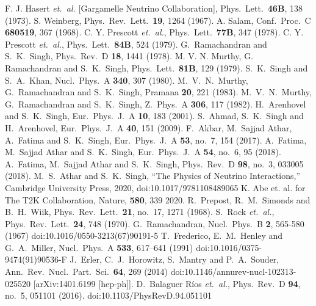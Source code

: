\begin{thebibliography}{99}
 F. J. Hasert {\it et.\ al.} [Gargamelle Neutrino Collaboration], Phys.\ Lett.\  {\bf 46B}, 138 (1973).  
 S. Weinberg, Phys.\ Rev.\ Lett.\  {\bf 19}, 1264 (1967).
 A. Salam,  Conf.\ Proc.\ C {\bf 680519}, 367 (1968).
 C. Y. Prescott {\it et.\ al.}, Phys.\ Lett.\  {\bf 77B}, 347 (1978).
 C. Y. Prescott {\it et.\ al.}, Phys.\ Lett.\  {\bf 84B}, 524 (1979).
 G.~Ramachandran and S.~K.~Singh, Phys.\ Rev.\ D {\bf 18}, 1441 (1978).
 M. V. N. Murthy, G. Ramachandran and S.~K.~Singh, Phys.\ Lett.\  {\bf 81B}, 129 (1979).
 S.~K.~Singh and S.~A.~Khan, Nucl.\ Phys.\ A {\bf 340}, 307 (1980).
 M.~V.~N.~Murthy, G.~Ramachandran and S.~K.~Singh, Pramana {\bf 20}, 221 (1983).
 M.~V.~N.~Murthy, G.~Ramachandran and S.~K.~Singh, Z.\ Phys.\ A {\bf 306}, 117 (1982).
 H.~Arenhovel and S.~K.~Singh, Eur.\ Phys.\ J.\ A {\bf 10}, 183 (2001).
 S.~Ahmad, S.~K.~Singh and H.~Arenhovel, Eur.\ Phys.\ J.\ A {\bf 40}, 151 (2009).
 F.~Akbar, M.~Sajjad Athar, A.~Fatima and S.~K.~Singh, Eur.\ Phys.\ J.\ A {\bf 53}, no.\ 7, 154 (2017).
 A.~Fatima, M.~Sajjad Athar and S.~K.~Singh, Eur.\ Phys.\ J.\ A {\bf 54}, no.\ 6, 95 (2018).
 A.~Fatima, M.~Sajjad Athar and S.~K.~Singh, Phys.\ Rev.\ D {\bf 98}, no.\ 3, 033005 (2018).
 M.~S.~Athar and S.~K.~Singh, ``The Physics of Neutrino Interactions,'' Cambridge University Press, 2020,  doi:10.1017/9781108489065
 K. Abe et. al. for The T2K Collaboration, Nature, {\bf 580}, 339 2020.
 R.~Prepost, R.~M.~Simonds and B.~H.~Wiik, Phys.\ Rev.\ Lett.\  {\bf 21}, no.\ 17, 1271 (1968).
 S.~Rock {\it et.\ al.}, Phys.\ Rev.\ Lett.\  {\bf 24}, 748 (1970).
 G.~Ramachandran, Nucl.\ Phys.\ B \textbf{2}, 565-580 (1967) doi:10.1016/0550-3213(67)90191-5
 T.~Frederico, E.~M.~Henley and G.~A.~Miller, Nucl.\ Phys.\ A \textbf{533}, 617--641 (1991) doi:10.1016/0375-9474(91)90536-F
  J.~Erler, C.~J.~Horowitz, S.~Mantry and P.~A.~Souder, Ann.\ Rev.\ Nucl.\ Part.\ Sci.\  {\bf 64}, 269 (2014)   doi:10.1146/annurev-nucl-102313-025520  [arXiv:1401.6199 [hep-ph]].
 D.~Balaguer Ríos {\it et.\ al.}, Phys.\ Rev.\ D {\bf 94}, no.\ 5, 051101 (2016).   doi:10.1103/PhysRevD.94.051101

\end{thebibliography}
